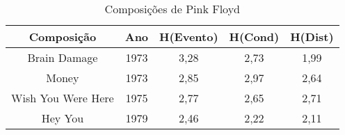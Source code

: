 \begin{table}[]
\centering
\caption{Composições de Pink Floyd}
\begin{tabular}{|c|c|c|c|c|}
\hline
\rowcolor[HTML]{9B9B9B} 
{\color[HTML]{FFFFFF} Composição} & {\color[HTML]{FFFFFF} Ano} & {\color[HTML]{FFFFFF} H(Evento)} & {\color[HTML]{FFFFFF} H(Cond)} & {\color[HTML]{FFFFFF} H(Dist)} \\ \hline
Brain Damage                      & 1973                       & 3,28                             & 2,73                           & 1,99                           \\ \hline
Money                             & 1973                       & 2,85                             & 2,97                           & 2,64                           \\ \hline
Wish You Were Here                & 1975                       & 2,77                             & 2,65                           & 2,71                           \\ \hline
Hey You                           & 1979                       & 2,46                             & 2,22                           & 2,11                           \\ \hline
\end{tabular}
\end{table}


